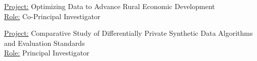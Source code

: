 \grantspace 
    {
        \underline{Project:} Optimizing Data to Advance Rural Economic Development \\ 
        \underline{Role:} Co-Principal Investigator
    }

\grantspace 
    {
        \underline{Project:} Comparative Study of Differentially Private Synthetic Data Algorithms and Evaluation Standards\\
        \underline{Role:} Principal Investigator
    }
    